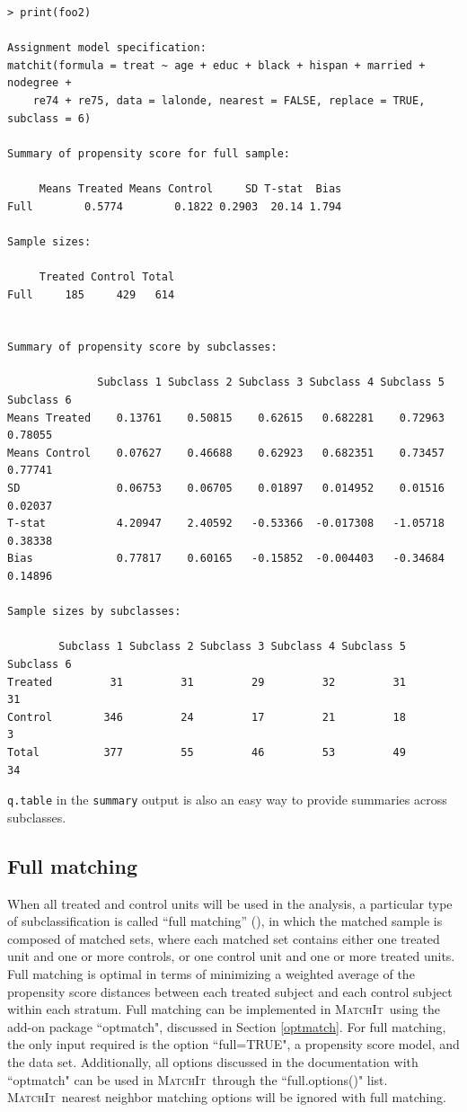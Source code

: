\documentclass[oneside,letterpaper,titlepage]{article}
\newcommand{\MatchIt}{\textsc{MatchIt}}
\begin{document}
\begin{verbatim}
> print(foo2)
 
Assignment model specification:
matchit(formula = treat ~ age + educ + black + hispan + married + nodegree + 
    re74 + re75, data = lalonde, nearest = FALSE, replace = TRUE, subclass = 6)
 
Summary of propensity score for full sample:
 
     Means Treated Means Control     SD T-stat  Bias
Full        0.5774        0.1822 0.2903  20.14 1.794
 
Sample sizes:
 
     Treated Control Total
Full     185     429   614
 
 
Summary of propensity score by subclasses:
 
              Subclass 1 Subclass 2 Subclass 3 Subclass 4 Subclass 5 Subclass 6
Means Treated    0.13761    0.50815    0.62615   0.682281    0.72963    0.78055
Means Control    0.07627    0.46688    0.62923   0.682351    0.73457    0.77741
SD               0.06753    0.06705    0.01897   0.014952    0.01516    0.02037
T-stat           4.20947    2.40592   -0.53366  -0.017308   -1.05718    0.38338
Bias             0.77817    0.60165   -0.15852  -0.004403   -0.34684    0.14896
 
Sample sizes by subclasses:
 
        Subclass 1 Subclass 2 Subclass 3 Subclass 4 Subclass 5 Subclass 6
Treated         31         31         29         32         31         31
Control        346         24         17         21         18          3
Total          377         55         46         53         49         34
\end{verbatim}

\noindent 
\texttt{q.table} in the {\tt summary} output is also an easy way to
provide summaries across subclasses.

\subsection{Full matching}
\label{fullmatching}

When all treated and control units will be used in the analysis, a
particular type of subclassification is called ``full matching''
(\cite{Rosenbaum02, Hansen04}), in which the matched sample is
composed of matched sets, where each matched set contains either one
treated unit and one or more controls, or one control unit and one or
more treated units.  Full matching is optimal in terms of minimizing a
weighted average of the propensity score distances between each
treated subject and each control subject within each stratum.  Full
matching can be implemented in \MatchIt\ using the add-on package
``optmatch", discussed in Section \ref{optmatch}.  For full matching,
the only input required is the option ``full=TRUE", a propensity score
model, and the data set.  Additionally, all options discussed in the
documentation with ``optmatch" can be used in \MatchIt\ through the
``full.options()" list.  \MatchIt\ nearest neighbor matching options
will be ignored with full matching.
\end{document}
